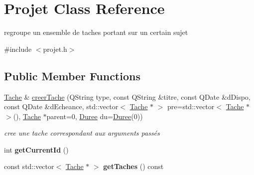 \hypertarget{class_projet}{}\section{Projet Class Reference}
\label{class_projet}


regroupe un ensemble de taches portant sur un certain sujet  




{\ttfamily \#include $<$projet.\+h$>$}

\subsection*{Public Member Functions}
\begin{DoxyCompactItemize}
\item 
\hyperlink{class_tache}{Tache} \& \hyperlink{class_projet_a10477fefcbcf0f058603b22bc0a43b26}{creer\+Tache} (Q\+String type, const Q\+String \&titre, const Q\+Date \&d\+Dispo, const Q\+Date \&d\+Echeance, std\+::vector$<$ \hyperlink{class_tache}{Tache} $\ast$ $>$ pre=std\+::vector$<$ \hyperlink{class_tache}{Tache} $\ast$ $>$(), \hyperlink{class_tache}{Tache} $\ast$parent=0, \hyperlink{class_duree}{Duree} du=\hyperlink{class_duree}{Duree}(0))
\begin{DoxyCompactList}\small\item\em cree une tache correspondant aux arguments passés \end{DoxyCompactList}\item 
\hypertarget{class_projet_a5d9ba2daebb428d6d5b8fa56b131ceb1}{}int {\bfseries get\+Current\+Id} ()\label{class_projet_a5d9ba2daebb428d6d5b8fa56b131ceb1}

\item 
\hypertarget{class_projet_add87a5985b93354bc4b763de259397ed}{}const std\+::vector$<$ \hyperlink{class_tache}{Tache} $\ast$ $>$ {\bfseries get\+Taches} () const \label{class_projet_add87a5985b93354bc4b763de259397ed}


\end{DoxyCompactItemize}
